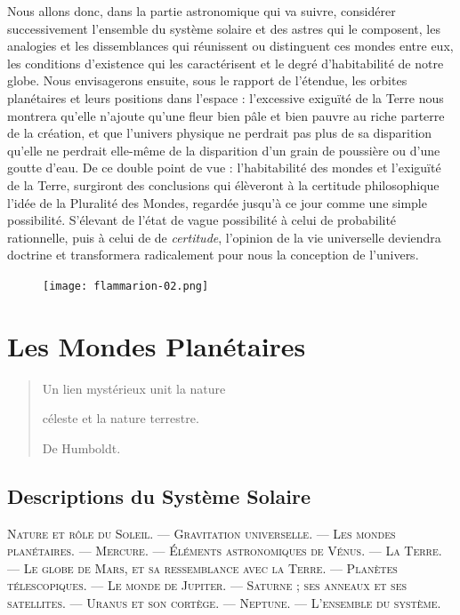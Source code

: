 \documentclass[a4paper, 11pt, oneside]{article}
\begin{document}
Nous allons donc, dans la partie astronomique qui va suivre, considérer successivement l'ensemble du système solaire et des astres qui le composent, les analogies et les dissemblances qui réunissent ou distinguent ces mondes entre eux, les conditions d'existence qui les caractérisent et le degré d'habitabilité de notre globe. Nous envisagerons ensuite, sous le rapport de l'étendue, les orbites planétaires et leurs positions dans l'espace : l'excessive exiguïté de la Terre nous montrera qu'elle n'ajoute qu'une fleur bien pâle et bien pauvre au riche parterre de la création, et que l'univers physique ne perdrait pas plus de sa disparition qu'elle ne perdrait elle-même de la disparition d'un grain de poussière ou d'une goutte d'eau. De ce double point de vue : l'habitabilité des mondes et l'exiguïté de la Terre, surgiront des conclusions qui élèveront à la certitude philosophique l'idée de la Pluralité des Mondes, regardée jusqu'à ce jour comme une simple possibilité. S'élevant de l'état de vague possibilité à celui de probabilité rationnelle, puis à celui de de \emph{certitude}, l'opinion de la vie universelle deviendra doctrine et transformera radicalement pour nous la conception de l'univers.
\clearpage
\vspace*{\fill}
\begin{figure}[H]
\centering
\texttt{[image: flammarion-02.png]}
\end{figure}
\vspace*{\fill}
\clearpage
\section{Les Mondes Planétaires}
\begin{quotation}
Un lien mystérieux unit la nature

céleste et la nature terrestre.

\hspace*{5mm}De Humboldt.
\end{quotation}

\bigskip

\subsection{Descriptions du Système Solaire}
\begin{center}
\scshape
\small
Nature et rôle du Soleil. --- Gravitation universelle. --- Les mondes planétaires. --- Mercure. --- Éléments astronomiques de Vénus. --- La Terre. --- Le globe de Mars, et sa ressemblance avec la Terre. --- Planètes télescopiques. --- Le monde de Jupiter. --- Saturne ; ses anneaux et ses satellites. --- Uranus et son cortège. --- Neptune. --- L'ensemble du système.
\end{center}
\end{document}
